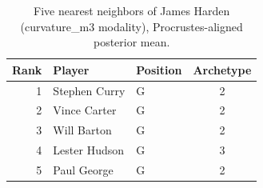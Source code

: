 \begin{table}[htbp]
  \centering\small
  \begin{tabular}{rllc}
    \toprule
    Rank & Player & Position & Archetype \\
    \midrule
    1 & Stephen Curry & G & 2 \\
    2 & Vince Carter & G & 2 \\
    3 & Will Barton & G & 2 \\
    4 & Lester Hudson & G & 3 \\
    5 & Paul George & G & 2 \\
    \bottomrule
  \end{tabular}
  \caption{Five nearest neighbors of James Harden (curvature_m3 modality), Procrustes-aligned posterior mean.}
  \label{tab:James_Harden_neighbors_curvature_m3}
\end{table}

